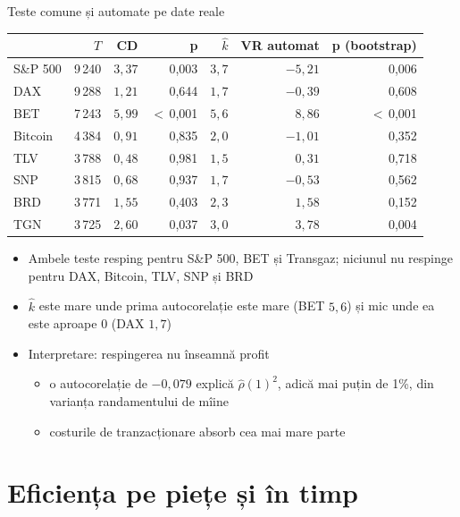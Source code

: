 \begin{frame}{Teste comune și automate pe date reale}
\itemsize{\footnotesize}
\begin{center}
\scriptsize
\begin{tabular}{lrrrrrr}
\toprule
& $T$ & CD & p & $\hat k$ & VR automat & p (bootstrap) \\
\midrule
S\&P 500 & 9\,240 & $3{,}37$ & 0{,}003 & $3{,}7$ & ${-5{,}21}$ & 0{,}006 \\
DAX & 9\,288 & $1{,}21$ & 0{,}644 & $1{,}7$ & ${-0{,}39}$ & 0{,}608 \\
BET & 7\,243 & $5{,}99$ & $<$\,0{,}001 & $5{,}6$ & ${8{,}86}$ & $<$\,0{,}001 \\
Bitcoin & 4\,384 & $0{,}91$ & 0{,}835 & $2{,}0$ & ${-1{,}01}$ & 0{,}352 \\
TLV & 3\,788 & $0{,}48$ & 0{,}981 & $1{,}5$ & ${0{,}31}$ & 0{,}718 \\
SNP & 3\,815 & $0{,}68$ & 0{,}937 & $1{,}7$ & ${-0{,}53}$ & 0{,}562 \\
BRD & 3\,771 & $1{,}55$ & 0{,}403 & $2{,}3$ & ${1{,}58}$ & 0{,}152 \\
TGN & 3\,725 & $2{,}60$ & 0{,}037 & $3{,}0$ & ${3{,}78}$ & 0{,}004 \\
\bottomrule
\end{tabular}
\end{center}
\begin{itemize}
    \item Ambele teste resping pentru S\&P 500, BET și Transgaz; niciunul nu respinge pentru DAX, Bitcoin, TLV, SNP și BRD
    \item $\hat k$ este mare unde prima autocorelație este mare (BET $5{,}6$) și mic unde ea este aproape 0 (DAX $1{,}7$)
    \item Interpretare: respingerea nu înseamnă profit
    \begin{itemize}
        \item o autocorelație de $-0{,}079$ explică $\hat\rho(1)^2$, adică mai puțin de 1\%, din varianța randamentului de mîine
        \item costurile de tranzacționare absorb cea mai mare parte
    \end{itemize}
\end{itemize}
\end{frame}


\section{Eficiența pe piețe și în timp}

